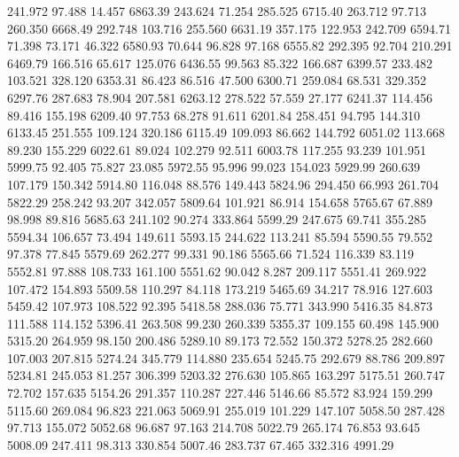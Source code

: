  241.972   97.488   14.457      6863.39
 243.624   71.254  285.525      6715.40
 263.712   97.713  260.350      6668.49
 292.748  103.716  255.560      6631.19
 357.175  122.953  242.709      6594.71
  71.398   73.171   46.322      6580.93
  70.644   96.828   97.168      6555.82
 292.395   92.704  210.291      6469.79
 166.516   65.617  125.076      6436.55
  99.563   85.322  166.687      6399.57
 233.482  103.521  328.120      6353.31
  86.423   86.516   47.500      6300.71
 259.084   68.531  329.352      6297.76
 287.683   78.904  207.581      6263.12
 278.522   57.559   27.177      6241.37
 114.456   89.416  155.198      6209.40
  97.753   68.278   91.611      6201.84
 258.451   94.795  144.310      6133.45
 251.555  109.124  320.186      6115.49
 109.093   86.662  144.792      6051.02
 113.668   89.230  155.229      6022.61
  89.024  102.279   92.511      6003.78
 117.255   93.239  101.951      5999.75
  92.405   75.827   23.085      5972.55
  95.996   99.023  154.023      5929.99
 260.639  107.179  150.342      5914.80
 116.048   88.576  149.443      5824.96
 294.450   66.993  261.704      5822.29
 258.242   93.207  342.057      5809.64
 101.921   86.914  154.658      5765.67
  67.889   98.998   89.816      5685.63
 241.102   90.274  333.864      5599.29
 247.675   69.741  355.285      5594.34
 106.657   73.494  149.611      5593.15
 244.622  113.241   85.594      5590.55
  79.552   97.378   77.845      5579.69
 262.277   99.331   90.186      5565.66
  71.524  116.339   83.119      5552.81
  97.888  108.733  161.100      5551.62
  90.042    8.287  209.117      5551.41
 269.922  107.472  154.893      5509.58
 110.297   84.118  173.219      5465.69
  34.217   78.916  127.603      5459.42
 107.973  108.522   92.395      5418.58
 288.036   75.771  343.990      5416.35
  84.873  111.588  114.152      5396.41
 263.508   99.230  260.339      5355.37
 109.155   60.498  145.900      5315.20
 264.959   98.150  200.486      5289.10
  89.173   72.552  150.372      5278.25
 282.660  107.003  207.815      5274.24
 345.779  114.880  235.654      5245.75
 292.679   88.786  209.897      5234.81
 245.053   81.257  306.399      5203.32
 276.630  105.865  163.297      5175.51
 260.747   72.702  157.635      5154.26
 291.357  110.287  227.446      5146.66
  85.572   83.924  159.299      5115.60
 269.084   96.823  221.063      5069.91
 255.019  101.229  147.107      5058.50
 287.428   97.713  155.072      5052.68
  96.687   97.163  214.708      5022.79
 265.174   76.853   93.645      5008.09
 247.411   98.313  330.854      5007.46
 283.737   67.465  332.316      4991.29
